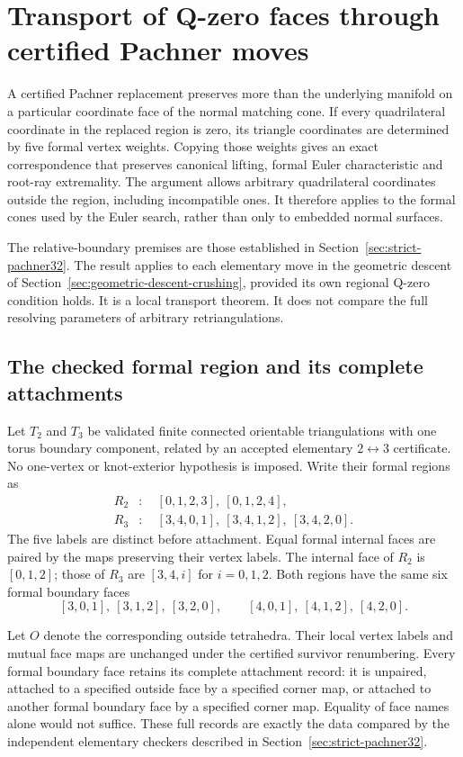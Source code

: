 \section{Transport of Q-zero faces through certified Pachner moves}
\label{sec:q-zero-pachner-transport}

A certified Pachner replacement preserves more than the underlying manifold
on a particular coordinate face of the normal matching cone.  If every
quadrilateral coordinate in the replaced region is zero, its triangle
coordinates are determined by five formal vertex weights.  Copying those
weights gives an exact correspondence that preserves canonical lifting,
formal Euler characteristic and root-ray extremality.  The argument allows
arbitrary quadrilateral coordinates outside the region, including
incompatible ones.  It therefore applies to the formal cones used by the
Euler search, rather than only to embedded normal surfaces.

The relative-boundary premises are those established in
Section~\ref{sec:strict-pachner32}.  The result applies to each elementary
move in the geometric descent of
Section~\ref{sec:geometric-descent-crushing}, provided its own regional
Q-zero condition holds.  It is a local transport theorem.  It does not
compare the full resolving parameters of arbitrary retriangulations.

\subsection{The checked formal region and its complete attachments}

Let $T_2$ and $T_3$ be validated finite connected orientable triangulations
with one torus boundary component, related by an accepted elementary
$2\leftrightarrow3$ certificate.  No one-vertex or knot-exterior hypothesis
is imposed.  Write their formal regions as
\[
\begin{aligned}
 R_2&:\quad [0,1,2,3],\ [0,1,2,4],\\
 R_3&:\quad [3,4,0,1],\ [3,4,1,2],\ [3,4,2,0].
\end{aligned}
\]
The five labels are distinct before attachment.  Equal formal internal
faces are paired by the maps preserving their vertex labels.  The internal
face of $R_2$ is $[0,1,2]$; those of $R_3$ are $[3,4,i]$ for $i=0,1,2$.
Both regions have the same six formal boundary faces
\[
 [3,0,1],\ [3,1,2],\ [3,2,0],\qquad
 [4,0,1],\ [4,1,2],\ [4,2,0].
\]

Let $O$ denote the corresponding outside tetrahedra.  Their local vertex
labels and mutual face maps are unchanged under the certified survivor
renumbering.  Every formal boundary face retains its complete attachment
record: it is unpaired, attached to a specified outside face by a specified
corner map, or attached to another formal boundary face by a specified
corner map.  Equality of face names alone would not suffice.  These full
records are exactly the data compared by the independent elementary
checkers described in Section~\ref{sec:strict-pachner32}.

